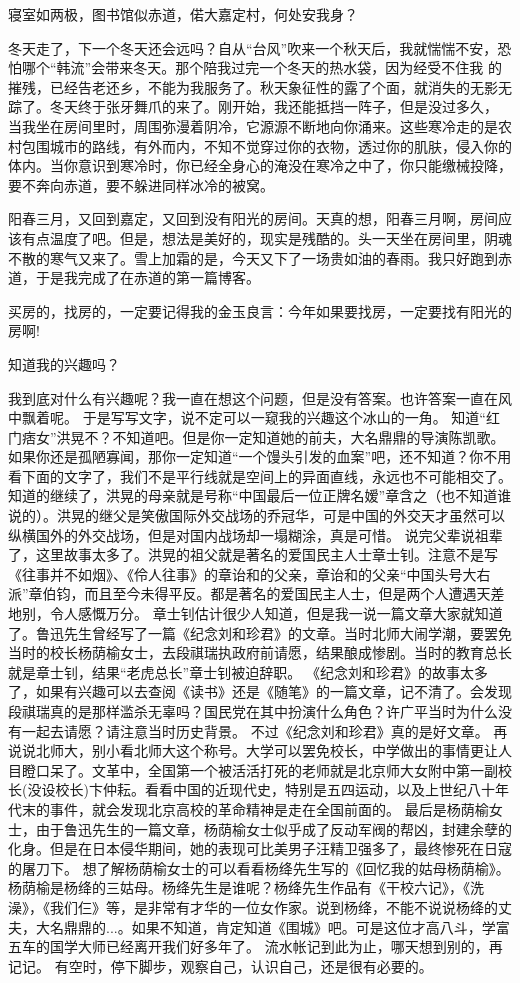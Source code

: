 寝室如两极，图书馆似赤道，偌大嘉定村，何处安我身？

冬天走了，下一个冬天还会远吗？自从“台风”吹来一个秋天后，我就惴惴不安，恐怕哪个“韩流”会带来冬天。那个陪我过完一个冬天的热水袋，因为经受不住我 的摧残，已经告老还乡，不能为我服务了。秋天象征性的露了个面，就消失的无影无踪了。冬天终于张牙舞爪的来了。刚开始，我还能抵挡一阵子，但是没过多久， 当我坐在房间里时，周围弥漫着阴冷，它源源不断地向你涌来。这些寒冷走的是农村包围城市的路线，有外而内，不知不觉穿过你的衣物，透过你的肌肤，侵入你的体内。当你意识到寒冷时，你已经全身心的淹没在寒冷之中了，你只能缴械投降，要不奔向赤道，要不躲进同样冰冷的被窝。

阳春三月，又回到嘉定，又回到没有阳光的房间。天真的想，阳春三月啊，房间应该有点温度了吧。但是，想法是美好的，现实是残酷的。头一天坐在房间里，阴魂不散的寒气又来了。雪上加霜的是，今天又下了一场贵如油的春雨。我只好跑到赤道，于是我完成了在赤道的第一篇博客。

买房的，找房的，一定要记得我的金玉良言：今年如果要找房，一定要找有阳光的房啊!


知道我的兴趣吗？

  我到底对什么有兴趣呢？我一直在想这个问题，但是没有答案。也许答案一直在风中飘着呢。
  于是写写文字，说不定可以一窥我的兴趣这个冰山的一角。
  知道“红门痞女”洪晃不？不知道吧。但是你一定知道她的前夫，大名鼎鼎的导演陈凯歌。如果你还是孤陋寡闻，那你一定知道“一个馒头引发的血案”吧，还不知道？你不用看下面的文字了，我们不是平行线就是空间上的异面直线，永远也不可能相交了。
  知道的继续了，洪晃的母亲就是号称“中国最后一位正牌名嫒”章含之（也不知道谁说的）。洪晃的继父是笑傲国际外交战场的乔冠华，可是中国的外交天才虽然可以纵横国外的外交战场，但是对国内战场却一塌糊涂，真是可惜。
  说完父辈说祖辈了，这里故事太多了。洪晃的祖父就是著名的爱国民主人士章士钊。注意不是写《往事并不如烟》、《伶人往事》的章诒和的父亲，章诒和的父亲“中国头号大右派”章伯钧，而且至今未得平反。都是著名的爱国民主人士，但是两个人遭遇天差地别，令人感慨万分。
  章士钊估计很少人知道，但是我一说一篇文章大家就知道了。鲁迅先生曾经写了一篇《纪念刘和珍君》的文章。当时北师大闹学潮，要罢免当时的校长杨荫榆女士，去段祺瑞执政府前请愿，结果酿成惨剧。当时的教育总长就是章士钊，结果“老虎总长”章士钊被迫辞职。
  《纪念刘和珍君》的故事太多了，如果有兴趣可以去查阅《读书》还是《随笔》的一篇文章，记不清了。会发现段祺瑞真的是那样滥杀无辜吗？国民党在其中扮演什么角色？许广平当时为什么没有一起去请愿？请注意当时历史背景。
  不过《纪念刘和珍君》真的是好文章。
  再说说北师大，别小看北师大这个称号。大学可以罢免校长，中学做出的事情更让人目瞪口呆了。文革中，全国第一个被活活打死的老师就是北京师大女附中第一副校长(没设校长)卞仲耘。看看中国的近现代史，特别是五四运动，以及上世纪八十年代末的事件，就会发现北京高校的革命精神是走在全国前面的。
  最后是杨荫榆女士，由于鲁迅先生的一篇文章，杨荫榆女士似乎成了反动军阀的帮凶，封建余孽的化身。但是在日本侵华期间，她的表现可比美男子汪精卫强多了，最终惨死在日寇的屠刀下。
  想了解杨荫榆女士的可以看看杨绛先生写的《回忆我的姑母杨荫榆》。杨荫榆是杨绛的三姑母。杨绛先生是谁呢？杨绛先生作品有《干校六记》，《洗澡》，《我们仨》等，是非常有才华的一位女作家。说到杨绛，不能不说说杨绛的丈夫，大名鼎鼎的...。如果不知道，肯定知道《围城》吧。可是这位才高八斗，学富五车的国学大师已经离开我们好多年了。
  流水帐记到此为止，哪天想到别的，再记记。
  有空时，停下脚步，观察自己，认识自己，还是很有必要的。


